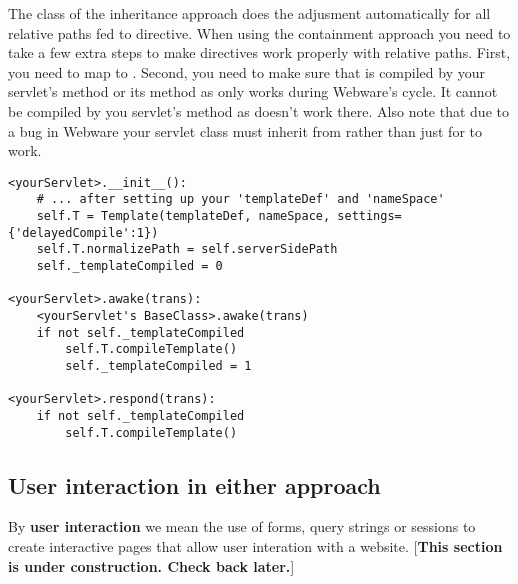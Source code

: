 The  class of the inheritance approach does the adjusment
automatically for all relative paths fed to  directive.  When
using the containment approach you need to take a few extra steps to make
 directives work properly with relative paths. First, you need
to map  to
. Second, you need to make sure that
 is compiled by your servlet's  method or
its  method as  only works during
Webware's  cycle.  It cannot be compiled by you
servlet's  method as  doesn't
work there.  Also note that due to a bug in Webware your servlet class must
inherit from  rather than just  for
 to work.

\begin{verbatim}
<yourServlet>.__init__():
    # ... after setting up your 'templateDef' and 'nameSpace'
    self.T = Template(templateDef, nameSpace, settings={'delayedCompile':1})
    self.T.normalizePath = self.serverSidePath
    self._templateCompiled = 0

<yourServlet>.awake(trans):
    <yourServlet's BaseClass>.awake(trans)
    if not self._templateCompiled
        self.T.compileTemplate()
        self._templateCompiled = 1

<yourServlet>.respond(trans):
    if not self._templateCompiled
        self.T.compileTemplate()
\end{verbatim}


\subsection{User interaction in either approach}
\label{webware.userInteraction}

By {\bf user interaction} we mean the use of forms, query strings or sessions to
create interactive pages that allow user interation with a website.
[{\bf This section is under construction. Check back later.}]



